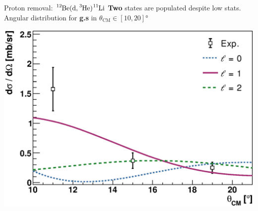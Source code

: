 \documentclass[sans,
frameno, %
mp,
usenames,dvipsnames, %
onlytextwidth, %
t,%
11pt]{beamer}
\newcommand{\iso}[2]{\ce{^{#1}#2}}
\begin{document}
\begin{frame}{Proton removal: $\iso{12}{Be}(\textrm{d}, \iso{3}{He})\iso{11}{Li}$}
    \textbf{Two} states are populated despite low stats. Angular distribution for \textbf{g.s} in $\theta_{\textrm{CM}} \in \left[10, 20\right]\unit{\degree}$

    \only<+>
    {
        \begin{minipage}[t]{0.48\linewidth}
            \centering
        \end{minipage}%
        \hfill
        \begin{minipage}[t]{0.48\linewidth}
            \centering
            \includegraphics[width=\textwidth]{figures/dxdo11Li0.eps}
        \end{minipage}

}
\end{frame}
\end{document}
